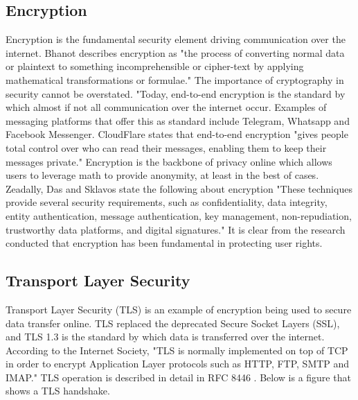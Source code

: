 \subsection{Encryption}
Encryption is the fundamental security element driving communication over the internet. Bhanot describes encryption as "the process of converting normal data or plaintext to something incomprehensible or cipher-text by applying mathematical transformations or formulae." \cite{bhanot2015review} The importance of cryptography in security cannot be overstated. "Today, end-to-end encryption is the standard by which almost if not all communication over the internet occur. Examples of messaging platforms that offer this as standard include Telegram, Whatsapp and Facebook Messenger. CloudFlare states that end-to-end encryption "gives people total control over who can read their messages, enabling them to keep their messages private." \cite{cloudflare_e2ee} Encryption is the backbone of privacy online which allows users to leverage math to provide anonymity, at least in the best of cases. Zeadally, Das and Sklavos state the following about encryption "These techniques provide several security requirements, such as confidentiality, data integrity, entity authentication, message authentication, key management, non-repudiation, trustworthy data platforms, and digital signatures." \cite{ZEADALLY2021100075} It is clear from the research conducted that encryption has been fundamental in protecting user rights. 

\subsection{Transport Layer Security}
Transport Layer Security (TLS) is an example of encryption being used to secure data transfer online. TLS replaced the deprecated Secure Socket Layers (SSL), and TLS 1.3 is the standard by which data is transferred over the internet. According to the Internet Society, "TLS is normally implemented on top of TCP in order to encrypt Application Layer protocols such as HTTP, FTP, SMTP and IMAP." \cite{internetsociety_tls_basics} TLS operation is described in detail in RFC 8446 \cite{rfc8446} \cite{cloudflare_tls_handshake}. Below is a figure that shows a TLS handshake.

